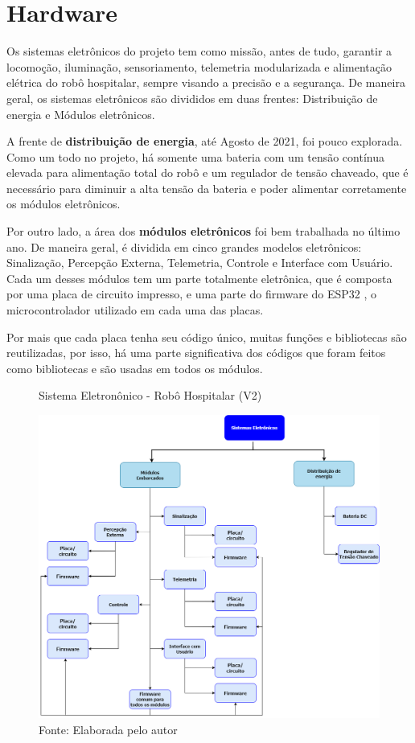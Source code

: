 \documentclass[../delivery_hospital_report.tex]{subfiles}
\begin{document}
\section{Hardware}
Os sistemas eletrônicos do projeto tem como missão, antes de tudo, garantir a locomoção, iluminação, sensoriamento, telemetria modularizada e alimentação elétrica do robô hospitalar, sempre visando a precisão e a segurança. De maneira geral, os sistemas eletrônicos são divididos em duas frentes: Distribuição de energia e Módulos eletrônicos.

A frente de \textbf{distribuição de energia}, até Agosto de 2021, foi pouco explorada. Como um todo no projeto, há somente uma bateria com um tensão contínua elevada para alimentação total do robô e um regulador de tensão chaveado, que é necessário para diminuir a alta tensão da bateria e poder alimentar corretamente os módulos eletrônicos.

Por outro lado, a área dos \textbf{módulos eletrônicos} foi bem trabalhada no último ano. De maneira geral, é dividida em cinco grandes modelos eletrônicos: Sinalização, Percepção Externa, Telemetria, Controle e Interface com Usuário. Cada um desses módulos tem um parte totalmente eletrônica, que é composta por uma placa de circuito impresso, e uma parte do firmware do ESP32 \cite{esp32_datasheet}, o microcontrolador utilizado em cada uma das placas.

Por mais que cada placa tenha seu código único, muitas funções e bibliotecas são reutilizadas, por isso, há uma parte significativa dos códigos que foram feitos como bibliotecas e são usadas em todos os módulos.


\begin{figure}[h]
\centering
    \caption{Sistema Eletronônico - Robô Hospitalar (V2)}
    \centering %
    \includegraphics[width=17cm]{sistema_eletronico.png}
    \caption*{Fonte: Elaborada pelo autor}
    \label{figura:1° Versão Robô Hospitalar}
\end{figure}
\end{document}
